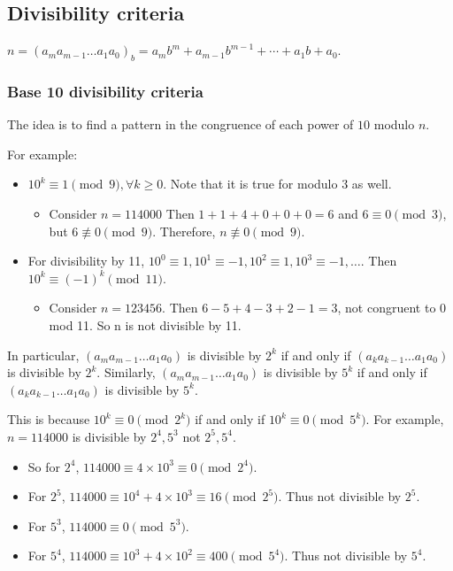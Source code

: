 \documentclass[letterpaper,12pt,oneside]{article}
\begin{document}
\subsection{Divisibility criteria}
$n=(a_m a_{m-1}\ldots a_1 a_0)_b=a_m b^m+a_{m-1}b^{m-1}+\cdots+a_1b+a_0$.

\subsubsection{Base 10 divisibility criteria}
The idea is to find a pattern in the congruence of each power of $10$ modulo $n$.

For example:\begin{itemize}
    \item $10^k\equiv 1 \pmod 9, \forall k\ge 0$. Note that it is true for modulo 3 as well.\begin{itemize}
        \item Consider $n=114000$ Then $1+1+4+0+0+0=6$ and $6\equiv 0 \pmod 3$, but $6\not\equiv 0 \pmod 9$. Therefore, $n\not\equiv 0 \pmod 9$.
    \end{itemize}
    \item For divisibility by 11, $10^0 \equiv 1, 10^1\equiv -1, 10^2\equiv 1, 10^3\equiv -1, \ldots$. Then $10^k\equiv (-1)^k \pmod {11}$.\begin{itemize}
        \item Consider $n=123456$. Then $6-5+4-3+2-1=3$, not congruent to 0 mod 11. So n is not divisible by 11.
    \end{itemize}
\end{itemize}
In particular, $(a_m a_{m-1}\ldots a_1 a_0)$ is divisible by $2^k$ if and only if $(a_k a_{k-1}\ldots a_1 a_0)$ is divisible by $2^k$. Similarly, $(a_m a_{m-1}\ldots a_1 a_0)$ is divisible by $5^k$ if and only if $(a_k a_{k-1}\ldots a_1 a_0)$ is divisible by $5^k$.

This is because $10^k\equiv 0 \pmod {2^k}$ if and only if $10^k\equiv 0 \pmod {5^k}$.
For example, $n=114000$ is divisible by $2^4,5^3$ not $2^5,5^4$.\begin{itemize}
    \item So for $2^4$, $114000\equiv 4\times 10^3 \equiv 0 \pmod {2^4}$.
    \item For $2^5$, $114000\equiv 10^4+ 4 \times 10^3 \equiv 16 \pmod {2^5}$. Thus not divisible by $2^5$.
    \item For $5^3$, $114000\equiv 0 \pmod {5^3}$.
    \item For $5^4$, $114000\equiv 10^3+4\times 10^2 \equiv 400 \pmod {5^4}$. Thus not divisible by $5^4$.
\end{itemize}
\end{document}
